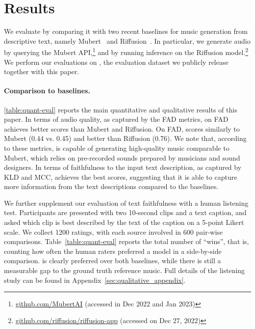 \section{Results}
\label{results}

We evaluate {\model} by comparing it with two recent baselines for music generation from descriptive text, namely Mubert~\cite{Mubert} and Riffusion~\cite{riffusion}. 
In particular, we generate audio by querying the Mubert API,\footnote{\href{https://github.com/MubertAI}{github.com/MubertAI} (accessed in Dec 2022 and Jan 2023)} and by running inference on the Riffusion model.\footnote{\href{https://github.com/riffusion/riffusion-app}{github.com/riffusion/riffusion-app} (accessed on Dec 27, 2022)}
We perform our evaluations on {\dataset}, the evaluation dataset we publicly release together with this paper.

\paragraph{Comparison to baselines.}
\label{results/comparison}

\cref{table:quant-eval} reports the main quantitative and qualitative results of this paper. In terms of audio quality, as captured by the FAD metrics, on FAD {\model} achieves better scores than Mubert and Riffusion. On FAD, {\model} scores similarly to Mubert (0.44 vs. 0.45) and better than Riffusion (0.76).
We note that, according to these metrics, {\model} is capable of generating high-quality music comparable to Mubert, which relies on pre-recorded sounds prepared by musicians and sound designers.
In terms of faithfulness to the input text description, as captured by KLD and MCC, {\model} achieves the best scores, suggesting that it is able to capture more information from the text descriptions compared to the baselines.

We further supplement our evaluation of text faithfulness with a human listening test. 
Participants are presented with two 10-second clips and a text caption, and asked which clip is best described by the text of the caption on a 5-point Likert scale. 
We collect 1200 ratings, with each source involved in 600 pair-wise comparisons. Table~\ref{table:quant-eval} reports the total number of ``wins'', that is, counting how often the human raters preferred a model in a side-by-side comparison. 
{\model} is clearly preferred over both baselines, while there is still a measurable gap to the ground truth reference music. Full details of the listening study can be found in Appendix~\ref{sec:qualitative_appendix}.


